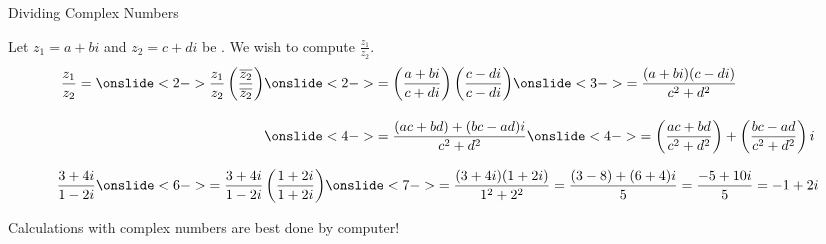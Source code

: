 \documentclass[xcolor=dvipsnames,aspectratio=169,t]{beamer}
\begin{document}
\begin{frame}{Dividing Complex Numbers}
  \bigskip
  
  Let $z_1 = a + b i$ and $z_2 = c+d i$ be .
  We wish to compute $\displaystyle \frac{z_1}{z_2}$.
  \begin{align*}
    \frac{z_1}{z_2} = \onslide<2->{\frac{z_1}{z_2} \left( \frac{\overline{z_2}}{\overline{z_2}}\right)}
    & \onslide<2->{= \left(\frac{a+bi}{c+di}\right) \left(\frac{c-di}{c-di}\right)}
      \onslide<3->{= \frac{(a+bi)(c-di)}{c^2+d^2} } \\[1em]
    & \onslide<4->{= \frac{(ac+bd)+(bc-ad)i}{c^2+d^2} }
      \onslide<4->{= \left(\frac{ac+bd}{c^2+d^2}\right) + \left(\frac{bc-ad}{c^2+d^2}\right)i }
  \end{align*}
  
  \pause\pause\pause\pause
  \begin{align*}
    \frac{3+4i}{1-2i} 
      \onslide<6->{ = \frac{3+4i}{1-2i} \left( \frac{1+2i}{1+2i} \right) }
      \onslide<7->{ = \frac{(3+4i)(1+2i)}{1^2+2^2} 
                    = \frac{(3-8)+(6+4)i}{5}
                    = \frac{-5+10i}{5} = -1+2i }
  \end{align*}
  \vspace*{.01em}
  
  \pause\pause\pause
  \hfill Calculations with complex numbers are best done by \alert{computer}!
\end{frame}
\end{document}
